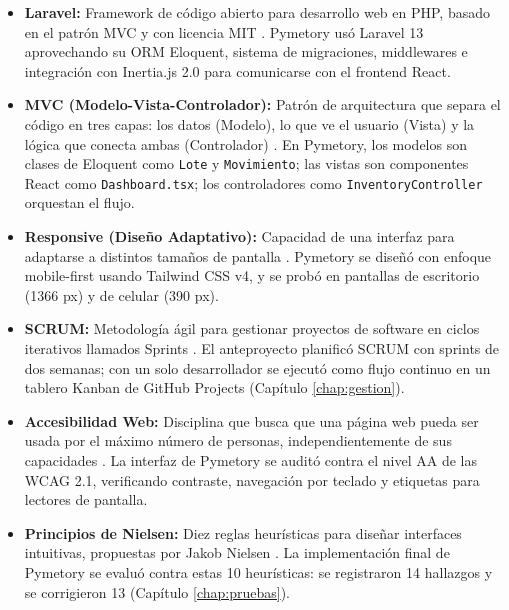\begin{itemize}
    \item \textbf{Laravel:} Framework de código abierto para desarrollo web en PHP, basado en el patrón MVC y con licencia MIT \cite{laraveldocs}. Pymetory usó Laravel 13 aprovechando su ORM Eloquent, sistema de migraciones, middlewares e integración con Inertia.js 2.0 para comunicarse con el frontend React.
    
    \item \textbf{MVC (Modelo-Vista-Controlador):} Patrón de arquitectura que separa el código en tres capas: los datos (Modelo), lo que ve el usuario (Vista) y la lógica que conecta ambas (Controlador) \cite{fowler2002poeaa}. En Pymetory, los modelos son clases de Eloquent como \texttt{Lote} y \texttt{Movimiento}; las vistas son componentes React como \texttt{Dashboard.tsx}; los controladores como \texttt{InventoryController} orquestan el flujo.
    
    \item \textbf{Responsive (Diseño Adaptativo):} Capacidad de una interfaz para adaptarse a distintos tamaños de pantalla \cite{mdn_responsive_design}. Pymetory se diseñó con enfoque mobile-first usando Tailwind CSS v4, y se probó en pantallas de escritorio (1366 px) y de celular (390 px).
    
    \item \textbf{SCRUM:} Metodología ágil para gestionar proyectos de software en ciclos iterativos llamados Sprints \cite{schwaber2020scrumguide}. El anteproyecto planificó SCRUM con sprints de dos semanas; con un solo desarrollador se ejecutó como flujo continuo en un tablero Kanban de GitHub Projects (Capítulo \ref{chap:gestion}).
    
    \item \textbf{Accesibilidad Web:} Disciplina que busca que una página web pueda ser usada por el máximo número de personas, independientemente de sus capacidades \cite{w3c_wcag_overview}. La interfaz de Pymetory se auditó contra el nivel AA de las WCAG 2.1, verificando contraste, navegación por teclado y etiquetas para lectores de pantalla.
    
    \item \textbf{Principios de Nielsen:} Diez reglas heurísticas para diseñar interfaces intuitivas, propuestas por Jakob Nielsen \cite{nielsen1994heuristics}. La implementación final de Pymetory se evaluó contra estas 10 heurísticas: se registraron 14 hallazgos y se corrigieron 13 (Capítulo \ref{chap:pruebas}).
    

\end{itemize}
